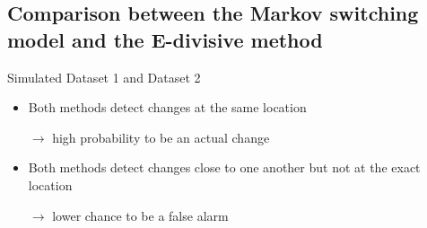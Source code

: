 \documentclass{beamer}
\begin{document}
\subsection{Comparison between the Markov switching model and the E-divisive method}
\begin{frame}[fragile]
Simulated Dataset 1 and Dataset 2
\pause
\begin{itemize}
	\item Both methods detect changes at the same location 
	
	$\rightarrow$ high probability to be an actual change
	
	\item Both methods detect changes close to one another but not at the exact location 
	
	$\rightarrow$ lower chance to be a false alarm
\end{itemize}

\end{frame}
\end{document}

